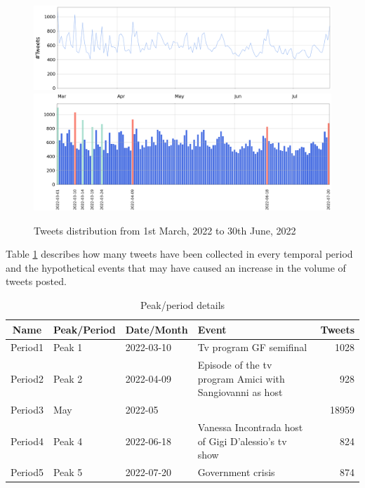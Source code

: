 \begin{figure}[H]
    \centering
    \includegraphics[width=1\textwidth]{images/monitoring/monitoring_lineplot_noX.png}
    \includegraphics[width=1\textwidth]{images/monitoring/monitoring_barplot_peaks.png}
    \caption{Tweets distribution from 1st March, 2022 to 30th June, 2022} 
    \label{online-monitoring}
\end{figure}


\noindent
Table \ref{table:peaks} describes how many tweets have been collected in every temporal period and the hypothetical events that may have caused an increase in the volume of tweets posted.
\vspace{5mm}

\begin{table}[H]
\centering
\setlength{\tabcolsep}{5pt}
\renewcommand\arraystretch{1.5}
\begin{tabular}{cllp{6cm}r}
\hline
Name & Peak/Period & Date/Month & Event & Tweets \\
\hline
Period1 & Peak 1 & 2022-03-10 & Tv program GF semifinal & 1028 \\
Period2 & Peak 2 & 2022-04-09 & Episode of the tv program Amici with Sangiovanni as host  & 928  \\
Period3 &  May   & 2022-05    &    & 18959\\
Period4 & Peak 4 & 2022-06-18 & Vanessa Incontrada host of Gigi D'alessio's tv show & 824  \\
Period5 & Peak 5 & 2022-07-20 & Government crisis & 874\\
\hline
\end{tabular}
\caption{Peak/period details}
\label{table:peaks}
\end{table}

